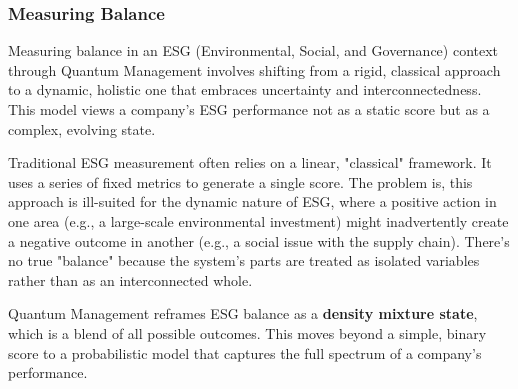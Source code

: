 \documentclass{article}
\begin{document}
\subsubsection*{Measuring Balance}
Measuring balance in an ESG (Environmental, Social, and Governance) context through Quantum Management involves shifting from a rigid, classical approach to a dynamic, holistic one that embraces uncertainty and interconnectedness. This model views a company's ESG performance not as a static score but as a complex, evolving state.

Traditional ESG measurement often relies on a linear, "classical" framework. It uses a series of fixed metrics to generate a single score. The problem is, this approach is ill-suited for the dynamic nature of ESG, where a positive action in one area (e.g., a large-scale environmental investment) might inadvertently create a negative outcome in another (e.g., a social issue with the supply chain). There's no true "balance" because the system's parts are treated as isolated variables rather than as an interconnected whole.

Quantum Management reframes ESG balance as a \textbf{density mixture state}, which is a blend of all possible outcomes. This moves beyond a simple, binary score to a probabilistic model that captures the full spectrum of a company's performance.
\end{document}
